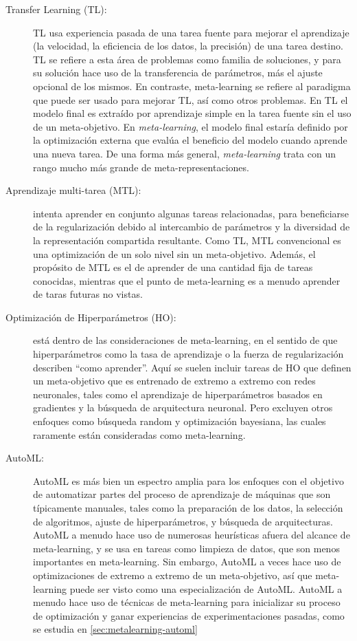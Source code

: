 \begin{description}
	\item[Transfer Learning (TL):] TL usa experiencia pasada de una tarea fuente para mejorar el aprendizaje (la velocidad, la eficiencia de los datos, la precisión) de una tarea destino. TL se refiere a esta área de problemas como familia de soluciones, y para su solución hace uso de la transferencia de parámetros, más el ajuste opcional de los mismos. En contraste, meta-learning se refiere al paradigma que puede ser usado para mejorar TL, así como otros problemas. En TL el modelo final es extraído por aprendizaje simple en la tarea fuente sin el uso de un meta-objetivo. En \emph{meta-learning}, el modelo final estaría definido por la optimización externa que evalúa el beneficio del modelo cuando aprende una nueva tarea. De una forma más general, \emph{meta-learning} trata con un rango mucho más grande de meta-representaciones.
	\item[Aprendizaje multi-tarea (MTL):] intenta aprender en conjunto algunas tareas relacionadas, para beneficiarse de la regularización debido al intercambio de parámetros y la diversidad de la representación compartida resultante. Como TL, MTL convencional es una optimización de un solo nivel sin un meta-objetivo. Además, el propósito de MTL es el de aprender de una cantidad fija de tareas conocidas, mientras que el punto de meta-learning es a menudo aprender de taras futuras no vistas. 
	\item[Optimización de Hiperparámetros (HO):] está dentro de las consideraciones de meta-learning, en el sentido de que hiperparámetros como la tasa de aprendizaje o la fuerza de regularización describen ``como aprender''. Aquí se suelen incluir tareas de HO que definen un meta-objetivo que es entrenado de extremo a extremo con redes neuronales, tales como el aprendizaje de hiperparámetros basados en gradientes y la búsqueda de arquitectura neuronal. Pero excluyen otros enfoques como búsqueda random y optimización bayesiana, las cuales raramente están consideradas como meta-learning.
	\item[AutoML:] AutoML es más bien un espectro amplia para los enfoques con el objetivo de automatizar partes del proceso de aprendizaje de máquinas que son típicamente manuales, tales como la preparación de los datos, la selección de algoritmos, ajuste de hiperparámetros, y búsqueda de arquitecturas. AutoML a menudo hace uso de numerosas heurísticas afuera del alcance de meta-learning, y se usa en tareas como limpieza de datos, que son menos importantes en meta-learning. Sin embargo, AutoML a veces hace uso de optimizaciones de extremo a extremo de un meta-objetivo, así que meta-learning puede ser visto como una especialización de AutoML. AutoML a menudo hace uso de técnicas de meta-learning para inicializar su proceso de optimización y ganar experiencias de experimentaciones pasadas, como se estudia en \ref{sec:metalearning-automl}
\end{description}

